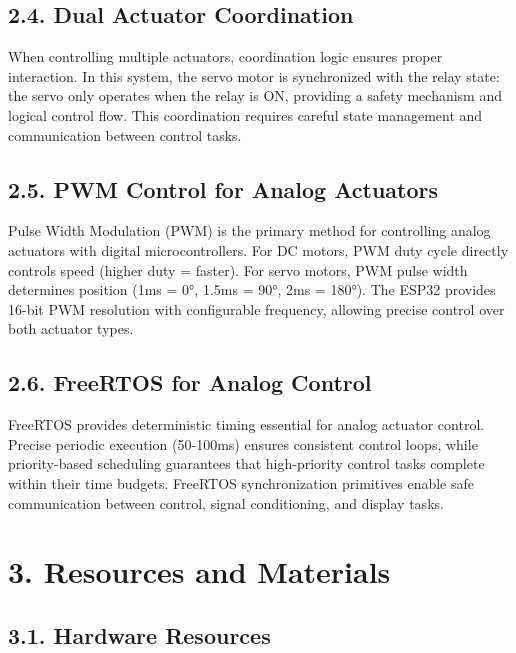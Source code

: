 \documentclass[12pt]{article}
\begin{document}
\subsection*{2.4. Dual Actuator Coordination}

When controlling multiple actuators, coordination logic ensures proper interaction. In this system, the servo motor is synchronized with the relay state: the servo only operates when the relay is ON, providing a safety mechanism and logical control flow. This coordination requires careful state management and communication between control tasks.

\subsection*{2.5. PWM Control for Analog Actuators}

Pulse Width Modulation (PWM) is the primary method for controlling analog actuators with digital microcontrollers. For DC motors, PWM duty cycle directly controls speed (higher duty = faster). For servo motors, PWM pulse width determines position (1ms = 0°, 1.5ms = 90°, 2ms = 180°). The ESP32 provides 16-bit PWM resolution with configurable frequency, allowing precise control over both actuator types.

\subsection*{2.6. FreeRTOS for Analog Control}

FreeRTOS provides deterministic timing essential for analog actuator control. Precise periodic execution (50-100ms) ensures consistent control loops, while priority-based scheduling guarantees that high-priority control tasks complete within their time budgets. FreeRTOS synchronization primitives enable safe communication between control, signal conditioning, and display tasks.

\section*{3. Resources and Materials}

\subsection*{3.1. Hardware Resources}
\end{document}
